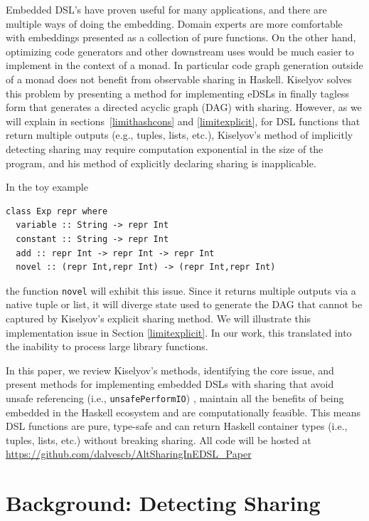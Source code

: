\documentclass[runningheads]{llncs}
\begin{document}
Embedded DSL's have proven useful for many applications, and there are multiple
ways of doing the embedding. Domain experts are more comfortable with embeddings
presented as a collection of pure functions. On the other hand, optimizing code
generators and other downstream uses would be much easier to implement in the
context of a monad. In particular code graph generation outside of a monad does
not benefit from observable sharing in Haskell. Kiselyov \cite{kiselyov:sharing}
solves this problem by presenting a method for implementing eDSLs in finally
tagless form that generates a directed acyclic graph (DAG) with sharing.
However, as we will explain in sections~\ref{limithashcons} and
\ref{limitexplicit}, for DSL functions that return multiple outputs (e.g.,
tuples, lists, etc.), Kiselyov's method of implicitly detecting sharing may
require computation exponential in the size of the program, and his method of
explicitly declaring sharing is inapplicable.

In the toy example
\begin{verbatim}
class Exp repr where
  variable :: String -> repr Int
  constant :: String -> repr Int
  add :: repr Int -> repr Int -> repr Int
  novel :: (repr Int,repr Int) -> (repr Int,repr Int)
\end{verbatim}
the function \texttt{novel} will exhibit this issue. Since it
returns multiple outputs via a native tuple or list, it will diverge state used
to generate the DAG that cannot be captured by Kiselyov's explicit sharing
method. We will illustrate this implementation issue in Section
\ref{limitexplicit}. In our work, this translated into the inability to process
large library functions.

\smallskip
In this paper, we review Kiselyov's methods, identifying the core issue, and
present methods for implementing embedded DSLs with sharing that avoid  unsafe referencing (i.e., \texttt{unsafePerformIO}) \cite{gill:observablesharing}, maintain all the benefits of being embedded in the Haskell ecosystem and are computationally feasible. This
means DSL functions are pure, type-safe and can return Haskell container types (i.e.,
tuples, lists, etc.) without breaking sharing. All code will be hosted at \url{https://github.com/dalvescb/AltSharingInEDSL_Paper}

\section{Background: Detecting Sharing}
\end{document}
